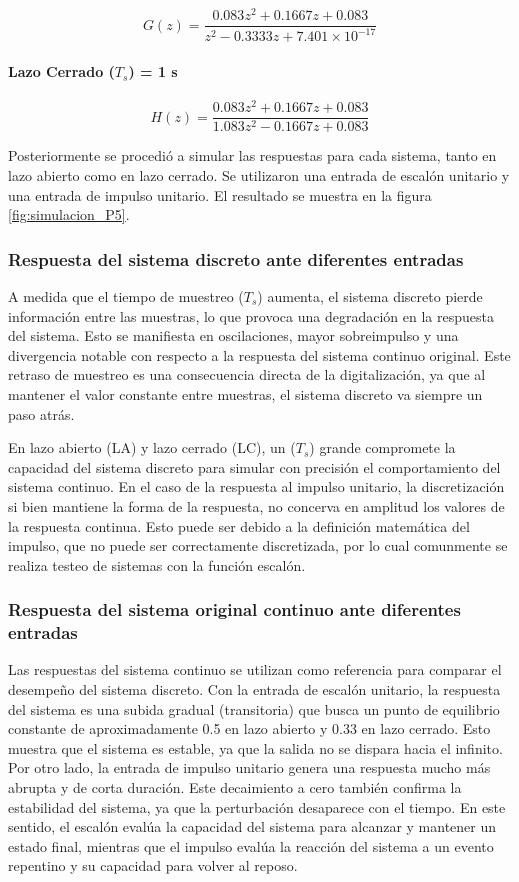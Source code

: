 \documentclass[journal]{IEEEtran}
\begin{document}
$$G(z) = \frac{0.083 z^2 + 0.1667 z + 0.083}{z^2 - 0.3333 z + 7.401 \times 10^{-17}}$$

\paragraph{Lazo Cerrado ($T_s$) = 1 s}

$$H(z) = \frac{0.083 z^2 + 0.1667 z + 0.083}{1.083 z^2 - 0.1667 z + 0.083}$$


Posteriormente se procedió a simular las respuestas para cada sistema, tanto en lazo abierto como en lazo cerrado. Se utilizaron una entrada de escalón unitario y una entrada de impulso unitario.
El resultado se muestra en la figura \ref{fig:simulacion_P5}.

\subsubsection{\textbf{Respuesta del sistema discreto ante diferentes entradas}}

A medida que el tiempo de muestreo ($T_s$) aumenta, el sistema discreto pierde información entre las muestras, lo que provoca una degradación en la respuesta del sistema. Esto se manifiesta en oscilaciones, mayor sobreimpulso y una divergencia notable con respecto a la respuesta del sistema continuo original.  Este retraso de muestreo es una consecuencia directa de la digitalización, ya que al mantener el valor constante entre muestras, el sistema discreto va siempre un paso atrás.

En lazo abierto (LA) y lazo cerrado (LC), un ($T_s$) grande compromete la capacidad del sistema discreto para simular con precisión el comportamiento del sistema continuo. En el caso de la respuesta al impulso unitario, la discretización si bien mantiene la forma de la respuesta, no concerva en amplitud los valores de la respuesta continua. Esto puede ser debido a la definición matemática del impulso, que no puede ser correctamente discretizada, por lo cual comunmente se realiza testeo de sistemas con la función escalón.

\subsubsection{\textbf{Respuesta del sistema original continuo ante diferentes entradas}}

Las respuestas del sistema continuo se utilizan como referencia para comparar el desempeño del sistema discreto. 
Con la entrada de escalón unitario, la respuesta del sistema es una subida gradual (transitoria) que busca un punto de equilibrio constante de aproximadamente 0.5 en lazo abierto y 0.33 en lazo cerrado. Esto muestra que el sistema es estable, ya que la salida no se dispara hacia el infinito. 
Por otro lado, la entrada de impulso unitario genera una respuesta mucho más abrupta y de corta duración.  Este decaimiento a cero también confirma la estabilidad del sistema, ya que la perturbación desaparece con el tiempo. 
En este sentido, el escalón evalúa la capacidad del sistema para alcanzar y mantener un estado final, mientras que el impulso evalúa la reacción del sistema a un evento repentino y su capacidad para volver al reposo.
\end{document}
